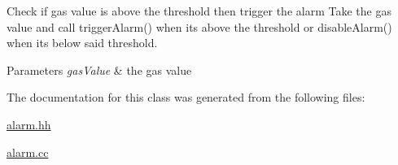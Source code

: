 Check if gas value is above the threshold then trigger the alarm Take the gas value and call trigger\+Alarm() when it\textquotesingle{}s above the threshold or disable\+Alarm() when it\textquotesingle{}s below said threshold. 


\begin{DoxyParams}{Parameters}
{\em gas\+Value} & the gas value \\
\hline
\end{DoxyParams}


The documentation for this class was generated from the following files\+:\begin{DoxyCompactItemize}
\item 
\hyperlink{alarm_8hh}{alarm.\+hh}\item 
\hyperlink{alarm_8cc}{alarm.\+cc}\end{DoxyCompactItemize}
